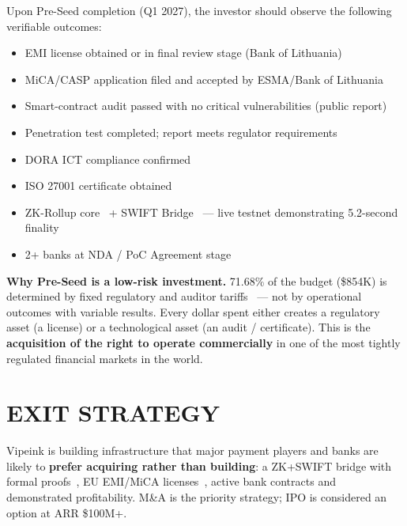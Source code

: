 \documentclass[11pt,a4paper]{article}
\begin{document}
Upon Pre-Seed completion (Q1 2027), the investor should observe the following verifiable outcomes:

\begin{itemize}[leftmargin=2em, itemsep=3pt, parsep=0pt]
\item EMI license obtained or in final review stage (Bank of Lithuania)~\cite{lb_emi}
\item MiCA/CASP application filed and accepted by ESMA/Bank of Lithuania~\cite{mica_reg,esma_mica}
\item Smart-contract audit passed with no critical vulnerabilities (public report)
\item Penetration test completed; report meets regulator requirements~\cite{tiber_eu}
\item DORA ICT compliance confirmed~\cite{dora_reg}
\item ISO 27001 certificate obtained~\cite{iso27001}
\item ZK-Rollup core~\cite{plonky2} + SWIFT Bridge~\cite{swift_mt103} --- live testnet demonstrating 5.2-second finality
\item 2+ banks at NDA / PoC Agreement stage
\end{itemize}

\begin{tcolorbox}[successbox]
\textbf{Why Pre-Seed is a low-risk investment.} 71.68\% of the budget (\$854K) is determined by fixed regulatory and auditor tariffs~\cite{lb_emi,mica_reg,dora_reg,iso27001,tiber_eu} --- not by operational outcomes with variable results. Every dollar spent either creates a regulatory asset (a license) or a technological asset (an audit / certificate). This is the \textbf{acquisition of the right to operate commercially} in one of the most tightly regulated financial markets in the world.
\end{tcolorbox}


\FloatBarrier
\section{EXIT STRATEGY}

Vipeink is building infrastructure that major payment players and banks are likely to \textbf{prefer acquiring rather than building}: a ZK+SWIFT bridge with formal proofs~\cite{plonky2,groth16}, EU EMI/MiCA licenses~\cite{lb_emi,mica_reg}, active bank contracts and demonstrated profitability. M\&A is the priority strategy; IPO is considered an option at ARR \$100M+.
\end{document}
